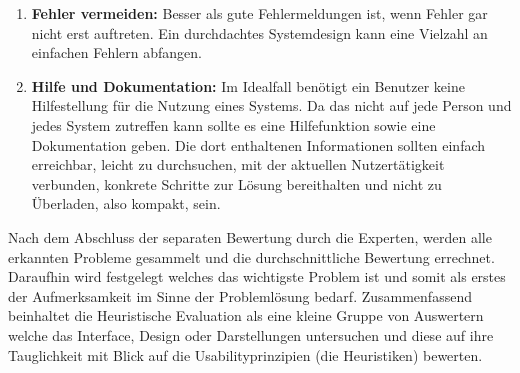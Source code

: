 \documentclass[draft=false
              ,paper=a4
              ,twoside=false
              ,fontsize=11pt
              ,headsepline
              ,BCOR10mm
              ,DIV11
              ]{scrbook}
\begin{document}
\begin{enumerate}
  \item \textbf{Fehler vermeiden:} Besser als gute Fehlermeldungen ist, wenn Fehler gar nicht erst auftreten. Ein durchdachtes Systemdesign kann eine Vielzahl an einfachen Fehlern abfangen.
  \item \textbf{Hilfe und Dokumentation:} Im Idealfall benötigt ein Benutzer keine Hilfestellung für die Nutzung eines Systems. Da das nicht auf jede Person und jedes System zutreffen kann sollte es eine Hilfefunktion sowie eine Dokumentation geben. Die dort enthaltenen Informationen sollten einfach erreichbar, leicht zu durchsuchen, mit der aktuellen Nutzertätigkeit verbunden, konkrete Schritte zur Lösung bereithalten und nicht zu Überladen, also kompakt, sein.
\end{enumerate}

Nach dem Abschluss der separaten Bewertung durch die Experten, werden alle erkannten Probleme gesammelt und die durchschnittliche Bewertung errechnet. Daraufhin wird festgelegt welches das wichtigste Problem ist und somit als erstes der Aufmerksamkeit im Sinne der Problemlösung bedarf.
Zusammenfassend beinhaltet die Heuristische Evaluation als eine kleine Gruppe von Auswertern welche das Interface, Design oder Darstellungen untersuchen und diese auf ihre Tauglichkeit mit Blick auf die Usabilityprinzipien (die Heuristiken) bewerten.
\end{document}
